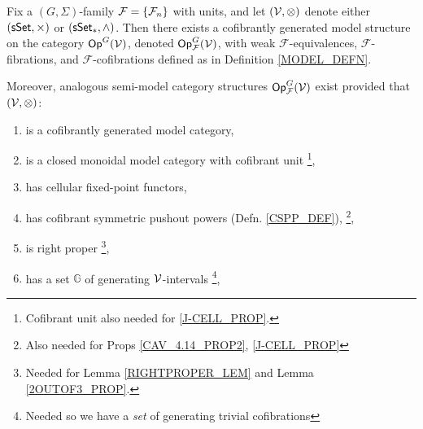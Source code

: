\documentclass[a4paper,10pt
,draft
]{article}%
\renewcommand{\F}{\mathcal F}
\renewcommand{\1}{\eta}%
\begin{document}
\begin{theorem}
      \label{MODEL_THM}
      Fix a $(G, \Sigma)$-family $\F = \set{\F_n}$ with units,
      and let $(\mathcal V, \otimes)$ denote either $(\mathsf{sSet}, \times)$ or $(\sSet_{\**}, \wedge)$.
      Then there exists a cofibrantly generated model structure on the category $\mathsf{Op}^G(\mathcal V)$,
      denoted $\Op^G_\F(\V)$, with
      weak $\F$-equivalences, $\F$-fibrations, and $\F$-cofibrations defined as in Definition \ref{MODEL_DEFN}.
           
      Moreover, analogous semi-model category structures $\Op^G_\F(\V)$ exist
      provided that $(\mathcal V, \otimes)$:
      \begin{enumerate}[label = (\roman*)]\itemsep-4pt
      \item is a cofibrantly generated model category,
      \item is a closed monoidal model category with cofibrant unit
            \footnote{Cofibrant unit also needed for \ref{J-CELL_PROP}.},
      \item has cellular fixed-point functors,
      \item \label{CSPP_LBL} has cofibrant symmetric pushout powers (Defn. \ref{CSPP_DEF}),
            \footnote{Also needed for Props \ref{CAV_4.14_PROP2}, \ref{J-CELL_PROP}}, %
      \item \label{RP_LBL} is right proper
            \footnote{Needed for Lemma \ref{RIGHTPROPER_LEM} and Lemma \ref{2OUTOF3_PROP}.},
      \item \label{GENSET_LBL} has a set $\mathbb{G}$ of generating $\mathcal V$-intervals
            \footnote{Needed so we have a \textit{set} of generating trivial cofibrations},
      \end{enumerate}
\end{theorem}
\end{document}
